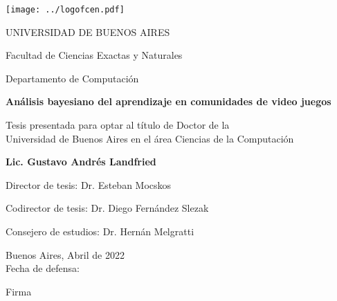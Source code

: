 \documentclass[a4paper,11pt]{book}
\author{Gustavo Landfried}
\makeatletter
\renewcommand{\frontmatter}{\cleardoublepage\@mainmatterfalse}
\theoremstyle{definition}
\newcommand{\TITULO}[0]{Análisis bayesiano del aprendizaje en comunidades de video juegos}
\makeatother
\begin{document}
\deactivatequoting %

\frontmatter
{}

\begin{center}

\texttt{[image: ../logofcen.pdf]}

\medskip
UNIVERSIDAD DE BUENOS AIRES

Facultad de Ciencias Exactas y Naturales

Departamento de Computación


\vspace{3cm}

\textbf{\LARGE \TITULO}

\vspace{1cm}



Tesis presentada para optar al título de Doctor de la \\
Universidad de Buenos Aires en el área Ciencias de la Computación

\vspace{2.5cm}

\textbf{Lic. Gustavo Andrés Landfried}

\end{center}

\vspace{2.5cm}

\noindent Director de tesis: Dr. Esteban Mocskos

\noindent Codirector de tesis: Dr. Diego Fernández Slezak

\noindent Consejero de estudios: Dr. Hernán Melgratti \\


\vspace{0.5cm}

\noindent Buenos Aires, Abril de 2022\\

\noindent Fecha de defensa: \\%

\vspace{0.5cm}

\hspace*{0pt}\hfill Firma \hspace{2cm}
\thispagestyle{empty}
\newpage
\end{document}
